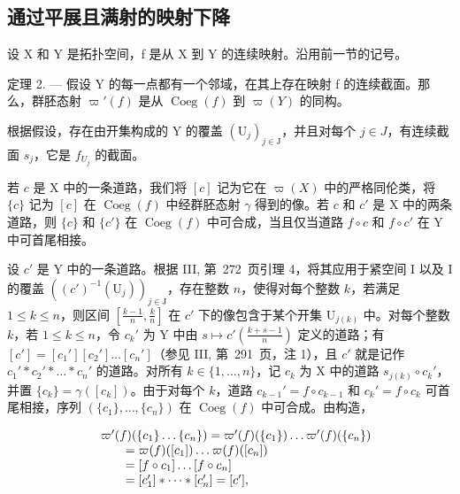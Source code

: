 \subsection{通过平展且满射的映射下降}

设 X 和 Y 是拓扑空间，f 是从 X 到 Y 的连续映射。沿用前一节的记号。

定理 2. --- 假设 Y 的每一点都有一个邻域，在其上存在映射 f 的连续截面。那么，群胚态射 \(\varpi'(f)\) 是从 \(\operatorname{Coeg}(f)\) 到 \(\varpi(Y)\) 的同构。

根据假设，存在由开集构成的 Y 的覆盖 \((\mathrm{U}_{j})_{j\in\mathrm{J}}\)，并且对每个 \(j\in J\)，有连续截面 \(s_{j}\)，它是 \(f_{U_{j}}\) 的截面。

若 \(c\) 是 X 中的一条道路，我们将 \([c]\) 记为它在 \(\varpi(X)\) 中的严格同伦类，将 \(\{c\}\) 记为 \([c]\) 在 \(\operatorname{Coeg}(f)\) 中经群胚态射 \(\gamma\) 得到的像。若 \(c\) 和 \(c'\) 是 X 中的两条道路，则 \(\{c\}\) 和 \(\{c'\}\) 在 \(\operatorname{Coeg}(f)\) 中可合成，当且仅当道路 \(f \circ c\) 和 \(f \circ c'\) 在 Y 中可首尾相接。

设 \(c'\) 是 Y 中的一条道路。根据 III, 第~272~页引理 4，将其应用于紧空间 I 以及 I 的覆盖 \(((c')^{-1}(\mathrm{U}_j))_{j\in \mathrm{J}}\)，存在整数 \(n\)，使得对每个整数 \(k\)，若满足 \(1\leqslant k\leqslant n\)，则区间 \([\frac{k - 1}{n},\frac{k}{n}]\) 在 \(c'\) 下的像包含于某个开集 \(\mathrm{U}_{j(k)}\) 中。对每个整数 \(k\)，若 \(1\leqslant k\leqslant n\)，令 \(c_k'\) 为 Y 中由 \(s\mapsto c'(\frac{k + s - 1}{n})\) 定义的道路；有 \([c'] = [c_1'][c_2']\ldots [c_n']\)（参见 III, 第~291~页，注 1），且 \(c'\) 就是记作 \(c_1' * c_2' * \dots * c_n'\) 的道路。对所有 \(k\in \{1,\ldots ,n\}\)，记 \(c_k\) 为 X 中的道路 \(s_{j(k)}\circ c_k'\)，并置 \(\{c_k\} = \gamma ([c_k])\)。由于对每个 \(k\)，道路 \(c_{k - 1}' = f\circ c_{k - 1}\) 和 \(c_k' = f\circ c_k\) 可首尾相接，序列 \((\{c_1\} ,\ldots ,\{c_n\})\) 在 \(\operatorname{Coeg}(f)\) 中可合成。由构造，

\[
\begin{array}{r l} & {\varpi^ {\prime} (f) (\{c _ {1} \} \ldots \{c _ {n} \}) = \varpi^ {\prime} (f) (\{c _ {1} \}) \ldots \varpi^ {\prime} (f) (\{c _ {n} \})} \\ & {\qquad = \varpi (f) ([ c _ {1} ]) \ldots \varpi (f) ([ c _ {n} ])} \\ & {\qquad = [ f \circ c _ {1} ] \ldots [ f \circ c _ {n} ]} \\ & {\qquad = [ c _ {1} ^ {\prime} ] * \dots * [ c _ {n} ^ {\prime} ] = [ c ^ {\prime} ],} \end{array}
\]

